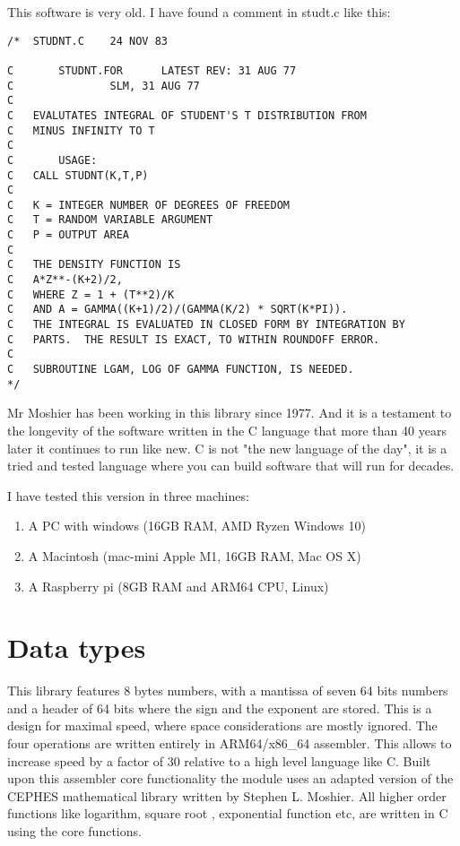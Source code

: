 \documentclass[10pt,a4paper,x11names]{memoir} %
\begin{document}
This software is very old. I have found a comment in studt.c like this:
\begin{verbatim}
/*  STUDNT.C    24 NOV 83

C       STUDNT.FOR      LATEST REV: 31 AUG 77
C               SLM, 31 AUG 77
C
C   EVALUTATES INTEGRAL OF STUDENT'S T DISTRIBUTION FROM
C   MINUS INFINITY TO T
C
C       USAGE:
C   CALL STUDNT(K,T,P)
C
C   K = INTEGER NUMBER OF DEGREES OF FREEDOM
C   T = RANDOM VARIABLE ARGUMENT
C   P = OUTPUT AREA
C
C   THE DENSITY FUNCTION IS
C   A*Z**-(K+2)/2,
C   WHERE Z = 1 + (T**2)/K
C   AND A = GAMMA((K+1)/2)/(GAMMA(K/2) * SQRT(K*PI)).
C   THE INTEGRAL IS EVALUATED IN CLOSED FORM BY INTEGRATION BY
C   PARTS.  THE RESULT IS EXACT, TO WITHIN ROUNDOFF ERROR.
C
C   SUBROUTINE LGAM, LOG OF GAMMA FUNCTION, IS NEEDED.
*/

\end{verbatim}
Mr Moshier has been working in this library since 1977. And it is a testament to the longevity of the 
software written in the C language that more than 40 years later it continues to run like new. C is not "the new language of the day", it
is a tried and tested language where you can build software that will run for decades.

I have tested this version in three machines:
\begin{enumerate}
\item A PC with windows (16GB RAM, AMD Ryzen Windows 10) 
\item  A Macintosh (mac-mini Apple M1, 16GB RAM, Mac OS X)
\item  A Raspberry pi (8GB RAM and ARM64 CPU, Linux)
\end{enumerate}

\chapter{Data types}
This library features 8 bytes numbers, with a mantissa of seven 64 bits numbers and a header of 64 bits where the sign and the exponent are stored. This is a design for maximal speed, where space considerations are mostly ignored. The four operations are written entirely in ARM64/x86\_64 assembler. This allows to increase speed by a factor of 30 relative to a high level language like C. Built upon this assembler core functionality the module uses an adapted version of the CEPHES mathematical library written by Stephen L. Moshier. All higher order functions like logarithm, square root , exponential function etc, are written in C using the core functions.
\end{document}
